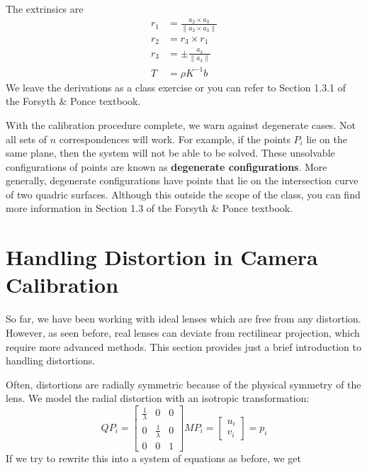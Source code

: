 \documentclass[a4paper, 12pt]{article}
\renewcommand\emph{\textbf}
\begin{document}
The extrinsics are 
\begin{equation}\begin{aligned}
    r_1 &= \frac{a_2\times a_3}{\|a_2\times a_3\|}\\
    r_2 &= r_3\times r_1\\
    r_3 &= \pm \frac{ a_3}{\| a_3\|}\\
    T &= \rho K^{-1} b
\end{aligned}\end{equation}
We leave the derivations as a class exercise or you can refer to Section 1.3.1 of the Forsyth \& Ponce textbook.

With the calibration procedure complete, we warn against degenerate cases. Not all sets of $n$ correspondences will work. For example, if the points $P_i$ lie on the same plane, then the system will not be able to be solved. These unsolvable configurations of points are known as \emph{degenerate configurations}. More generally, degenerate configurations have points that lie on the intersection curve of two quadric surfaces. Although this outside the scope of the class, you can find more information in Section 1.3 of the Forsyth \& Ponce textbook. 

\section{Handling Distortion in Camera Calibration}
So far, we have been working with ideal lenses which are free from any distortion. However, as seen before, real lenses can deviate from rectilinear projection, which require more advanced methods. This section provides just a brief introduction to handling distortions. 

Often, distortions are radially symmetric because of the physical symmetry of the lens. We model the radial distortion with an isotropic transformation:
\begin{equation}
    QP_i = \begin{bmatrix}
    \frac{1}{\lambda}&0&0\\0 &    \frac{1}{\lambda} & 0 \\ 0 & 0 &1\end{bmatrix} M P_i = \begin{bmatrix}
    u_i\\v_i\end{bmatrix}
    = p_i
\end{equation}
If we try to rewrite this into a system of equations as before, we get 
\end{document}
